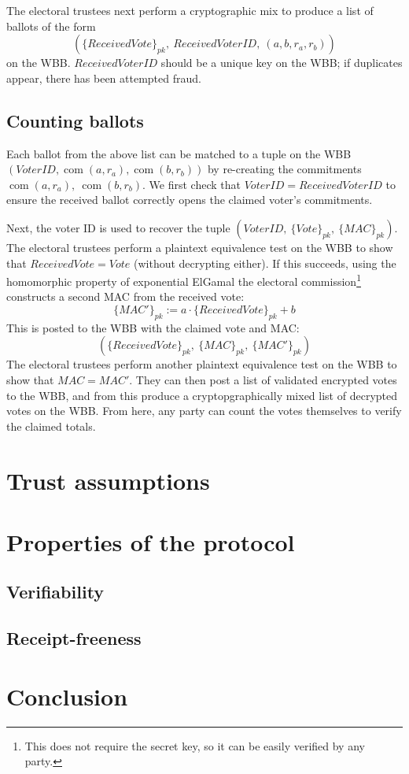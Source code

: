 \documentclass[11pt,twoside,a4paper]{article}
\DeclareMathOperator{\com}{com}
\theoremstyle{definition}
\begin{document}
The electoral trustees next perform a cryptographic mix to produce a list of ballots of the form
\[(\{ReceivedVote\}_{pk},\ ReceivedVoterID,\ (a,b,r_a,r_b))\]
on the WBB. \(ReceivedVoterID\) should be a unique key on the WBB; if duplicates appear, there has been attempted fraud.
\subsection{Counting ballots}
Each ballot from the above list can be matched to a tuple on the WBB \((VoterID, \com(a,r_a), \com(b,r_b))\) by re-creating the commitments \(\com(a,r_a),\ \com(b, r_b)\). We first check that \(VoterID=ReceivedVoterID\) to ensure the received ballot correctly opens the claimed voter's commitments.

Next, the voter ID is used to recover the tuple \((VoterID,\ \{Vote\}_{pk},\ \{MAC\}_{pk})\). The electoral trustees perform a plaintext equivalence test on the WBB to show that \(ReceivedVote=Vote\) (without decrypting either). If this succeeds, using the homomorphic property of exponential ElGamal the electoral commission\footnote{This does not require the secret key, so it can be easily verified by any party.} constructs a second MAC from the received vote:
\[\{MAC'\}_{pk}:=a\cdot\{ReceivedVote\}_{pk}+b\]
This is posted to the WBB with the claimed vote and MAC:
\[(\{ReceivedVote\}_{pk},\ \{MAC\}_{pk},\ \{MAC'\}_{pk})\]
The electoral trustees perform another plaintext equivalence test on the WBB to show that \(MAC=MAC'\). They can then post a list of validated encrypted votes to the WBB, and from this produce a cryptopgraphically mixed list of decrypted votes on the WBB. From here, any party can count the votes themselves to verify the claimed totals.
\section{Trust assumptions}
\section{Properties of the protocol}\label{sec-properties}
\subsection{Verifiability}
\subsection{Receipt-freeness}
\section{Conclusion}
\vfill\pagebreak
\end{document}
